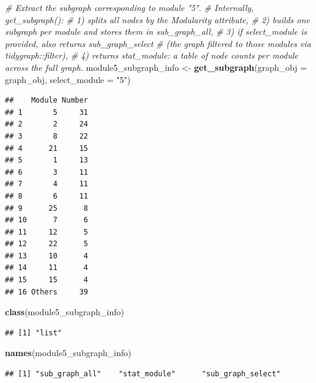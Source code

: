 \documentclass[
]{book}
\newenvironment{Shaded}{\begin{snugshade}}{\end{snugshade}}
\newcommand{\AttributeTok}[1]{\textcolor[rgb]{0.13,0.29,0.53}{#1}}
\newcommand{\CommentTok}[1]{\textcolor[rgb]{0.56,0.35,0.01}{\textit{#1}}}
\newcommand{\FunctionTok}[1]{\textcolor[rgb]{0.13,0.29,0.53}{\textbf{#1}}}
\newcommand{\NormalTok}[1]{#1}
\newcommand{\OtherTok}[1]{\textcolor[rgb]{0.56,0.35,0.01}{#1}}
\newcommand{\StringTok}[1]{\textcolor[rgb]{0.31,0.60,0.02}{#1}}
\begin{document}
\begin{Shaded}
\begin{Highlighting}[]
\CommentTok{\# Extract the subgraph corresponding to module "5".}
\CommentTok{\# Internally, get\_subgraph():}
\CommentTok{\#   1) splits all nodes by the \textasciigrave{}Modularity\textasciigrave{} attribute,}
\CommentTok{\#   2) builds one subgraph per module and stores them in \textasciigrave{}sub\_graph\_all\textasciigrave{},}
\CommentTok{\#   3) if \textasciigrave{}select\_module\textasciigrave{} is provided, also returns \textasciigrave{}sub\_graph\_select\textasciigrave{}}
\CommentTok{\#      (the graph filtered to those modules via tidygraph::filter),}
\CommentTok{\#   4) returns \textasciigrave{}stat\_module\textasciigrave{}: a table of node counts per module across the full graph.}
\NormalTok{module5\_subgraph\_info }\OtherTok{\textless{}{-}} \FunctionTok{get\_subgraph}\NormalTok{(}\AttributeTok{graph\_obj =}\NormalTok{ graph\_obj,}
                                      \AttributeTok{select\_module =} \StringTok{"5"}\NormalTok{)}
\end{Highlighting}
\end{Shaded}

\begin{verbatim}
##    Module Number
## 1       5     31
## 2       2     24
## 3       8     22
## 4      21     15
## 5       1     13
## 6       3     11
## 7       4     11
## 8       6     11
## 9      25      8
## 10      7      6
## 11     12      5
## 12     22      5
## 13     10      4
## 14     11      4
## 15     15      4
## 16 Others     39
\end{verbatim}

\begin{Shaded}
\begin{Highlighting}[]
\FunctionTok{class}\NormalTok{(module5\_subgraph\_info) }
\end{Highlighting}
\end{Shaded}

\begin{verbatim}
## [1] "list"
\end{verbatim}

\begin{Shaded}
\begin{Highlighting}[]
\FunctionTok{names}\NormalTok{(module5\_subgraph\_info)}
\end{Highlighting}
\end{Shaded}

\begin{verbatim}
## [1] "sub_graph_all"    "stat_module"      "sub_graph_select"
\end{verbatim}
\end{document}
